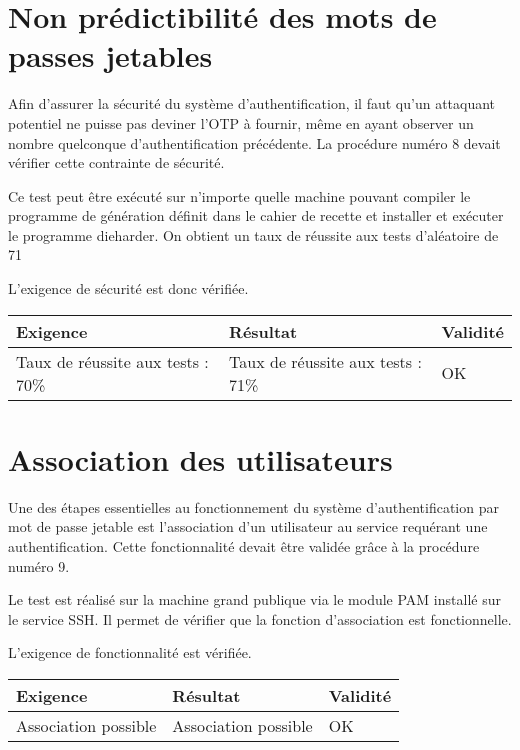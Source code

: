 \documentclass{"../../res/univ-projet"}
\begin{document}
	\section{Non prédictibilité des mots de passes jetables}
	Afin d'assurer la sécurité du système d'authentification, il faut qu'un attaquant potentiel ne puisse pas deviner
	l'OTP à fournir, même en ayant observer un nombre quelconque d'authentification précédente. La procédure numéro 8
	devait vérifier cette contrainte de sécurité.
	
	Ce test peut être exécuté sur n'importe quelle machine pouvant compiler le programme de génération définit dans le
	cahier de recette et installer et exécuter le programme dieharder. On obtient un taux de réussite aux tests 
	d'aléatoire de 71%
	
	L'exigence de sécurité est donc vérifiée.
    
    \begin{center}	
		\begin{tabular}{| p{6cm} | p{6cm} | p{2cm} |}
			\hline
			\cellcolor{lightgray} Exigence & \cellcolor{lightgray} Résultat & 
			\cellcolor{lightgray} Validité \\ \hline
		
			Taux de réussite aux tests : 70\% & Taux de réussite aux tests : 71\% & \cellcolor{green} OK \\ \hline
		\end{tabular}
	\end{center}
	
	\section{Association des utilisateurs}
	Une des étapes essentielles au fonctionnement du système d'authentification par mot de passe jetable est
	l'association d'un utilisateur au service requérant une authentification. Cette fonctionnalité devait être validée
	grâce à la procédure numéro 9.
	
	Le test est réalisé sur la machine grand publique via le module PAM installé sur le service SSH. Il permet de 
	vérifier que la fonction d'association est fonctionnelle.
	
	L'exigence de fonctionnalité est vérifiée.
    
    \begin{center}	
		\begin{tabular}{| p{6cm} | p{6cm} | p{2cm} |}
			\hline
			\cellcolor{lightgray} Exigence & \cellcolor{lightgray} Résultat & 
			\cellcolor{lightgray} Validité \\ \hline
		
			Association possible & Association possible & \cellcolor{green} OK \\ \hline
		\end{tabular}
	\end{center}
	
\end{document}
